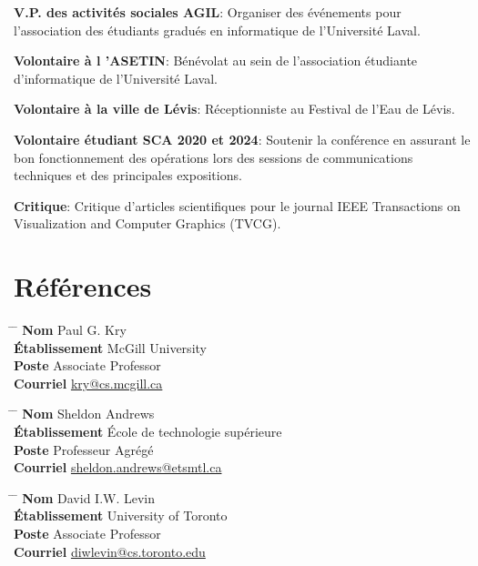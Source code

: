 \documentclass[10pt]{article} %
\begin{document}
\noindent\textbf{V.P. des activités sociales AGIL}: Organiser des événements pour l'association des étudiants gradués en informatique de l'Université Laval.

\noindent\textbf{Volontaire à l 'ASETIN}: Bénévolat au sein de l'association étudiante d'informatique de l'Université Laval.

\noindent\textbf{Volontaire à la ville de Lévis}: Réceptionniste au Festival de l'Eau de Lévis.

\noindent\textbf{Volontaire étudiant SCA 2020 et 2024}: Soutenir la conférence en assurant le bon fonctionnement des opérations lors des
sessions de communications techniques et des principales expositions.

\noindent\textbf{Critique}: Critique d'articles scientifiques pour le journal IEEE Transactions on Visualization and Computer Graphics (TVCG).

\section{Références}

\parbox{0.5\textwidth}{
\begin{tabbing}
\hspace{2.75cm} \= \hspace{4cm} \= \kill
{\bf Nom} \> Paul G. Kry\\ 
{\bf Établissement} \> McGill University\\ 
{\bf Poste} \> Associate Professor \\ 
{\bf Courriel} \> \href{mailto:kry@cs.mcgill.ca}{kry@cs.mcgill.ca}
\end{tabbing}}

\noindent\parbox{0.5\textwidth}{
\begin{tabbing}
\hspace{2.75cm} \= \hspace{4cm} \= \kill
{\bf Nom} \> Sheldon Andrews\\ 
{\bf Établissement} \> École de technologie supérieure\\ 
{\bf Poste} \>  Professeur Agrégé \\ 
{\bf Courriel} \> \href{mailto:sheldon.andrews@etsmtl.ca}{sheldon.andrews@etsmtl.ca}
\end{tabbing}}

\noindent\parbox{0.5\textwidth}{
\begin{tabbing}
\hspace{2.75cm} \= \hspace{4cm} \= \kill
{\bf Nom} \> David I.W. Levin\\ 
{\bf Établissement} \> University of Toronto\\ 
{\bf Poste} \>Associate Professor \\ 
{\bf Courriel} \> \href{mailto:diwlevin@cs.toronto.edu}{diwlevin@cs.toronto.edu}
\end{tabbing}}


\end{document}
